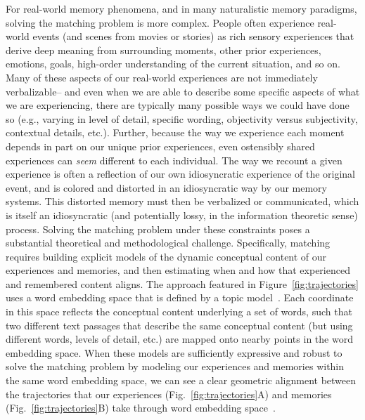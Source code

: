 \documentclass{article}
\begin{document}
For real-world memory phenomena, and in many naturalistic memory paradigms, solving the matching problem is more complex.  People often experience real-world events (and scenes from movies or stories) as rich sensory experiences that derive deep meaning from surrounding moments, other prior experiences, emotions, goals, high-order understanding of the current situation, and so on.  Many of these aspects of our real-world experiences are not immediately verbalizable-- and even when we are able to describe some specific aspects of what we are experiencing, there are typically many possible ways we could have done so (e.g., varying in level of detail, specific wording, objectivity versus subjectivity, contextual details, etc.).  Further, because the way we experience each moment depends in part on our unique prior experiences, even ostensibly shared experiences can \textit{seem} different to each individual.  The way we recount a given experience is often a reflection of our own idiosyncratic experience of the original event, and is colored and distorted in an idiosyncratic way by our memory systems.  This distorted memory must then be verbalized or communicated, which is itself an idiosyncratic (and potentially lossy, in the information theoretic sense) process.  Solving the matching problem under these constraints poses a substantial theoretical and methodological challenge.  Specifically, matching requires building explicit models of the dynamic conceptual content of our experiences and memories, and then estimating when and how that experienced and remembered content aligns.  The approach featured in Figure~\ref{fig:trajectories} uses a word embedding space that is defined by a topic model~\citep{BleiEtal03}.  Each coordinate in this space reflects the conceptual content underlying a set of words, such that two different text passages that describe the same conceptual content (but using different words, levels of detail, etc.) are mapped onto nearby points in the word embedding space.  When these models are sufficiently expressive and robust to solve the matching problem by modeling our experiences and memories within the same word embedding space, we can see a clear geometric alignment between the trajectories that our experiences (Fig.~\ref{fig:trajectories}A) and memories (Fig.~\ref{fig:trajectories}B) take through word embedding space~\citep[also see][]{HeusEtal18c}.
\end{document}
